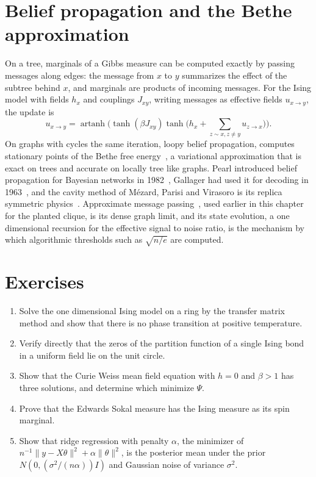 \section{Belief propagation and the Bethe approximation}

On a tree, marginals of a Gibbs measure can be computed exactly by passing messages along edges: the message from $x$ to $y$ summarizes the effect of the subtree behind $x$, and marginals are products of incoming messages. For the Ising model with fields $h_x$ and couplings $J_{xy}$, writing messages as effective fields $u_{x\to y}$, the update is
\[
u_{x\to y} = \operatorname{artanh}\Big(\tanh(\beta J_{xy})\tanh\Big(h_x+\sum_{z\sim x,z\neq y}u_{z\to x}\Big)\Big).
\]
On graphs with cycles the same iteration, loopy belief propagation, computes stationary points of the Bethe free energy~\cite{yedidia2005}, a variational approximation that is exact on trees and accurate on locally tree like graphs. Pearl introduced belief propagation for Bayesian networks in 1982~\cite{pearl1982}, Gallager had used it for decoding in 1963~\cite{gallager1963}, and the cavity method of M\'ezard, Parisi and Virasoro is its replica symmetric physics~\cite{mezard2009}. Approximate message passing~\cite{donoho2009,bayati2011}, used earlier in this chapter for the planted clique, is its dense graph limit, and its state evolution, a one dimensional recursion for the effective signal to noise ratio, is the mechanism by which algorithmic thresholds such as $\sqrt{n/e}$ are computed.

\section*{Exercises}
\begin{enumerate}
\item Solve the one dimensional Ising model on a ring by the transfer matrix method and show that there is no phase transition at positive temperature.
\item Verify directly that the zeros of the partition function of a single Ising bond in a uniform field lie on the unit circle.
\item Show that the Curie Weiss mean field equation with $h = 0$ and $\beta>1$ has three solutions, and determine which minimize $\Psi$.
\item Prove that the Edwards Sokal measure has the Ising measure as its spin marginal.
\item Show that ridge regression with penalty $\alpha$, the minimizer of $n^{-1}\|y-X\theta\|^2+\alpha\|\theta\|^2$, is the posterior mean under the prior $N(0,(\sigma^2/(n\alpha))I)$ and Gaussian noise of variance $\sigma^2$.
\end{enumerate}
